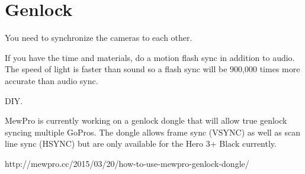 \chapter{Genlock}
\pagecolor{white}
\label{chap:24}
\begin{fullwidth}


\problem

{\large You need to synchronize the cameras to each other. 

 \par}

If you have the time and materials, do a motion flash sync in addition to audio. The speed of light is faster than sound so a flash sync will be 900,000 times more accurate than audio sync. 

\solution

{\large DIY.

 \par}

MewPro is currently working on a genlock dongle that will allow true genlock syncing multiple GoPros. The dongle allows frame sync (VSYNC) as well as scan line sync (HSYNC) but are only available for the Hero 3+ Black currently. 

http://mewpro.cc/2015/03/20/how-to-use-mewpro-genlock-dongle/

\clearpage
\end{fullwidth}
